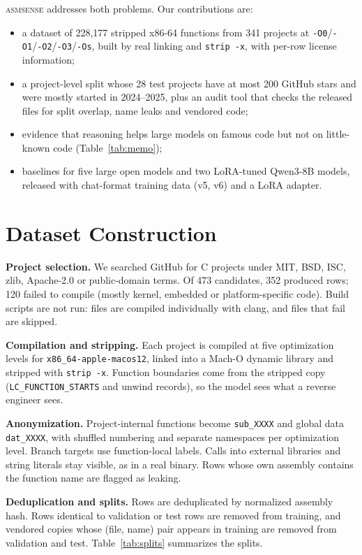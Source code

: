 \documentclass[conference]{IEEEtran}
\newcommand{\tool}{\textsc{asmsense}\xspace}
\begin{document}
\tool addresses both problems. Our contributions are:
\begin{itemize}
  \item a dataset of 228,177 stripped x86-64 functions from 341 projects at \texttt{-O0}/\texttt{-O1}/\texttt{-O2}/\texttt{-O3}/\texttt{-Os}, built by real linking and \texttt{strip -x}, with per-row license information;
  \item a project-level split whose 28 test projects have at most 200 GitHub stars and were mostly started in 2024--2025, plus an audit tool that checks the released files for split overlap, name leaks and vendored code;
  \item evidence that reasoning helps large models on famous code but not on little-known code (Table~\ref{tab:memo});
  \item baselines for five large open models and two LoRA-tuned Qwen3-8B models, released with chat-format training data (v5, v6) and a LoRA adapter.
\end{itemize}

\section{Dataset Construction}
\textbf{Project selection.} We searched GitHub for C projects under MIT, BSD, ISC, zlib, Apache-2.0 or public-domain terms. Of 473 candidates, 352 produced rows; 120 failed to compile (mostly kernel, embedded or platform-specific code). Build scripts are not run: files are compiled individually with clang, and files that fail are skipped.

\textbf{Compilation and stripping.} Each project is compiled at five optimization levels for \texttt{x86\_64-apple-macos12}, linked into a Mach-O dynamic library and stripped with \texttt{strip -x}. Function boundaries come from the stripped copy (\texttt{LC\_FUNCTION\_STARTS} and unwind records), so the model sees what a reverse engineer sees.

\textbf{Anonymization.} Project-internal functions become \texttt{sub\_XXXX} and global data \texttt{dat\_XXXX}, with shuffled numbering and separate namespaces per optimization level. Branch targets use function-local labels. Calls into external libraries and string literals stay visible, as in a real binary. Rows whose own assembly contains the function name are flagged as leaking.

\textbf{Deduplication and splits.} Rows are deduplicated by normalized assembly hash. Rows identical to validation or test rows are removed from training, and vendored copies whose (file, name) pair appears in training are removed from validation and test. Table~\ref{tab:splits} summarizes the splits.
\end{document}
